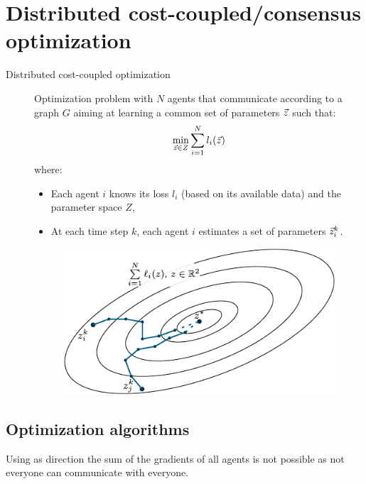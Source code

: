 \section{Distributed cost-coupled/consensus optimization}

\begin{description}
    \item[Distributed cost-coupled optimization] 
        Optimization problem with $N$ agents that communicate according to a graph $G$ aiming at learning a common set of parameters ${\vec{z}}$ such that:
        \[
            \min_{{\vec{z}} \in Z} \sum_{i=1}^{N} l_i({\vec{z}})
        \]
        where:
        \begin{itemize}
            \item Each agent $i$ knows its loss $l_i$ (based on its available data) and the parameter space $Z$,
            \item At each time step $k$, each agent $i$ estimates a set of parameters ${\vec{z}}_i^k$.
        \end{itemize}

        \begin{figure}[H]
            \centering
            \includegraphics[width=0.45\linewidth]{./img/_distributed_cost_coupled.pdf}
        \end{figure}
\end{description}


\subsection{Optimization algorithms}

\begin{remark}
    Using as direction the sum of the gradients of all agents is not possible as not everyone can communicate with everyone.
\end{remark}

